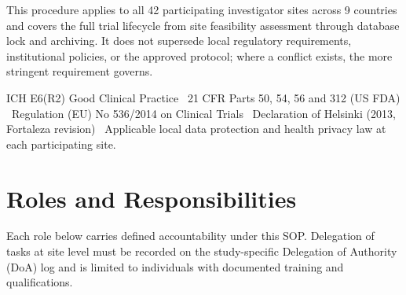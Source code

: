 \documentclass[11pt,a4paper]{scrreprt}
\begin{document}
This procedure applies to all 42 participating investigator sites across 9 countries and covers
the full trial lifecycle from site feasibility assessment through database lock and archiving.
It does not supersede local regulatory requirements, institutional policies, or the approved
protocol; where a conflict exists, the more stringent requirement governs.

\begin{tcolorbox}[
  colback=soplight, colframe=sopnavy, boxrule=0.6pt, arc=2pt,
  left=8pt, right=8pt, top=6pt, bottom=6pt,
  title={\faFileMedical\ \ Applicable Regulations and Guidance},
  coltitle=white, colbacktitle=sopnavy, fonttitle=\bfseries\small,
  attach boxed title to top left={xshift=8pt,yshift=-2pt},
  boxed title style={boxrule=0pt,arc=2pt}
]
\small
ICH E6(R2) Good Clinical Practice \textbullet\ 21 CFR Parts 50, 54, 56 and 312 (US FDA)
\textbullet\ Regulation (EU) No 536/2014 on Clinical Trials \textbullet\ Declaration of
Helsinki (2013, Fortaleza revision) \textbullet\ Applicable local data protection and health
privacy law at each participating site.
\end{tcolorbox}

\section{Roles and Responsibilities}

Each role below carries defined accountability under this SOP. Delegation of tasks at site
level must be recorded on the study-specific Delegation of Authority (DoA) log and is limited
to individuals with documented training and qualifications.
\end{document}
